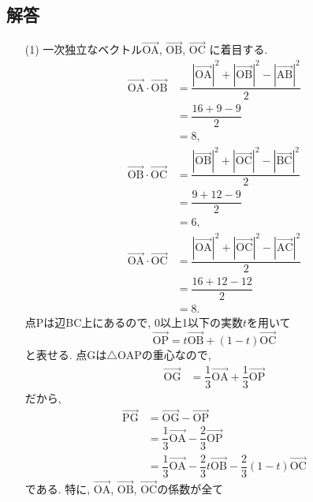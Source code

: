 \documentclass[dvipdfmx,a4paper]{jsarticle}
\newcommand{\oraw}{\overrightarrow}
\newcommand{\2}{I\hspace{-1pt}I}
\newcommand{\3}{I\hspace{-1pt}I\hspace{-1pt}I}
\begin{document}
    \subsection{解答}
    \begin{itemize}
        \item [(1)] 一次独立なベクトル$\oraw{\mathrm{OA}}$, $\oraw{\mathrm{OB}}$, $\oraw{\mathrm{OC}}$
        に着目する. 
        \begin{align*}
            \oraw{\mathrm{OA}} \cdot \oraw{\mathrm{OB}}
            &= \dfrac{|\oraw{\mathrm{OA}}|^2 + |\oraw{\mathrm{OB}}|^2 - |\oraw{\mathrm{AB}}|^2}{2} \\
            &= \dfrac{16 + 9 - 9}{2} \\
            &= 8, \\
            \oraw{\mathrm{OB}} \cdot \oraw{\mathrm{OC}}
            &= \dfrac{|\oraw{\mathrm{OB}}|^2 + |\oraw{\mathrm{OC}}|^2 - |\oraw{\mathrm{BC}}|^2}{2} \\
            &= \dfrac{9 + 12 - 9}{2} \\
            &= 6, \\
            \oraw{\mathrm{OA}} \cdot \oraw{\mathrm{OC}}
            &= \dfrac{|\oraw{\mathrm{OA}}|^2 + |\oraw{\mathrm{OC}}|^2 - |\oraw{\mathrm{AC}}|^2}{2} \\
            &= \dfrac{16 + 12 - 12}{2} \\
            &= 8.
        \end{align*}
        点Pは辺BC上にあるので, 0以上1以下の実数$t$を用いて
        \begin{equation*}
            \oraw{\mathrm{OP}} = t\oraw{\mathrm{OB}} + (1-t)\oraw{\mathrm{OC}}
        \end{equation*}
        と表せる. 点Gは$\triangle \mathrm{OAP}$の重心なので, 
        \begin{align*}
            \oraw{\mathrm{OG}} &= \dfrac{1}{3}\oraw{\mathrm{OA}} + \dfrac{1}{3}\oraw{\mathrm{OP}}
        \end{align*}
        だから, 
        \begin{align*}
            \oraw{\mathrm{PG}} &= \oraw{\mathrm{OG}} - \oraw{\mathrm{OP}} \\
            &= \dfrac{1}{3}\oraw{\mathrm{OA}} - \dfrac{2}{3}\oraw{\mathrm{OP}} \\
            &= \dfrac{1}{3}\oraw{\mathrm{OA}} - \dfrac{2}{3}t\oraw{\mathrm{OB}} - \dfrac{2}{3} (1-t)\oraw{\mathrm{OC}}
        \end{align*}
        である. 特に, $\oraw{\mathrm{OA}}$, $\oraw{\mathrm{OB}}$, $\oraw{\mathrm{OC}}$の係数が全て

\end{itemize}
\end{document}

